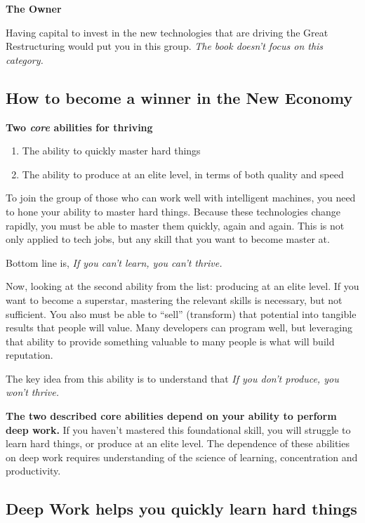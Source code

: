 \documentclass[12pt, letterpaper]{article}
\begin{document}
\bigbreak\noindent\textbf{The Owner}

Having capital to invest in the new technologies that are driving the Great Restructuring would put you in this group. \emph{The book doesn't focus on this category.}

\subsection*{How to become a winner in the New Economy}
\bigbreak\noindent\textbf{Two \emph{core} abilities for thriving}
\begin{enumerate}
    \item The ability to quickly master hard things
    \item The ability to produce at an elite level, in terms of both quality and speed
\end{enumerate}

To join the group of those who can work well with intelligent machines, you need to hone your ability to master hard things. Because these technologies change rapidly, you must be able to master them quickly, again and again. This is not only applied to tech jobs, but any skill that you want to become master at.

Bottom line is, \emph{If you can't learn, you can't thrive.}

Now, looking at the second ability from the list: producing at an elite level. If you want to become a superstar, mastering the relevant skills is necessary, but not sufficient. You also must be able to ``sell'' (transform) that potential into tangible results that people will value. Many developers can program well, but leveraging that ability to provide something valuable to many people is what will build reputation.

The key idea from this ability is to understand that \emph{If you don't produce, you won't thrive.}

\bigbreak\textbf{The two described core abilities depend on your ability to perform deep work.}
If you haven't mastered this foundational skill, you will struggle to learn hard things, or produce at an elite level. The dependence of these abilities on deep work requires understanding of the science of learning, concentration and productivity.

\subsection*{Deep Work helps you quickly learn hard things}
\end{document}
